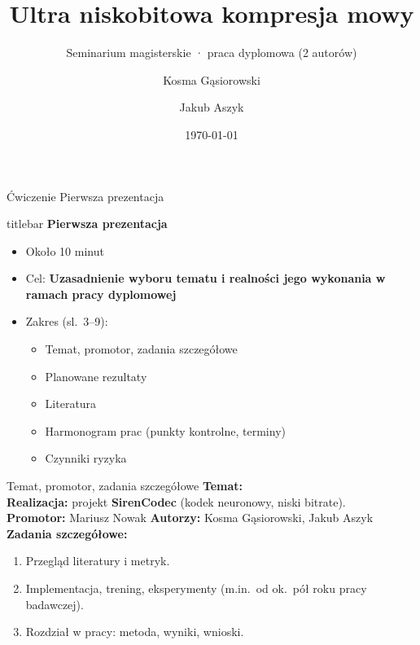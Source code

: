 \documentclass[aspectratio=169,11pt]{beamer}
\title{Ultra niskobitowa kompresja mowy}
\subtitle{\small Seminarium magisterskie · praca dyplomowa (2 autorów)}
\author{Kosma Gąsiorowski \and Jakub Aszyk}
\institute{Politechnika Poznańska\\[0.25em]
  {\small Kierunek: Informatyka \quad Przedmiot: Internet}\\[0.35em]
  Promotor: Mariusz Nowak}
\date{\today}
\newcommand{\exerciseheader}{%
  \begin{center}\normalsize Ćwiczenie Pierwsza prezentacja\end{center}\vspace{0.5em}}
\begin{document}
\nocite{*}

\begin{frame}[plain]
  \titlepage
\end{frame}

\begin{frame}[plain]{}
  \exerciseheader
  \begin{beamercolorbox}[wd=\paperwidth,sep=0.55em,center]{titlebar}
    \centering\Large\bfseries Pierwsza prezentacja
  \end{beamercolorbox}
  \vspace{0.55em}
  {\small
  \begin{itemize}\setlength{\itemsep}{0.35em}
    \item Około 10 minut
    \item Cel: \textbf{Uzasadnienie wyboru tematu i realności jego wykonania w ramach pracy dyplomowej}
    \item Zakres (sl.\ 3--9):
      \begin{itemize}\setlength{\itemsep}{0.22em}
        \item Temat, promotor, zadania szczegółowe
        \item Planowane rezultaty
        \item Literatura
        \item Harmonogram prac (punkty kontrolne, terminy)
        \item Czynniki ryzyka
      \end{itemize}
  \end{itemize}
  }
\end{frame}

\begin{frame}{Temat, promotor, zadania szczegółowe}
  \textbf{Temat:} \inserttitle\\[0.35em]
  \textbf{Realizacja:} projekt \textbf{SirenCodec} (kodek neuronowy, niski bitrate).\\[0.5em]
  \textbf{Promotor:} Mariusz Nowak \quad \textbf{Autorzy:} Kosma Gąsiorowski, Jakub Aszyk\\[0.55em]
  \textbf{Zadania szczegółowe:}
  \begin{enumerate}
    \item Przegląd literatury i metryk.
    \item Implementacja, trening, eksperymenty (m.in.\ od ok.\ pół roku pracy badawczej).
    \item Rozdział w pracy: metoda, wyniki, wnioski.
  \end{enumerate}
\end{frame}
\end{document}
